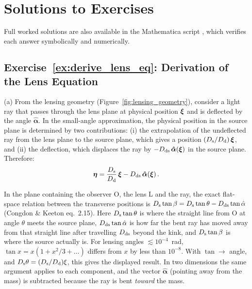 
\section{Solutions to Exercises}
\label{sec:lens_eq_solutions}

\noindent
Full worked solutions are also available in the Mathematica script
,
which verifies each answer symbolically and numerically.

\subsection*{Exercise~\ref{ex:derive_lens_eq}: Derivation of the Lens Equation}

(a) From the lensing geometry (Figure~\ref{fig:lensing_geometry}),
consider a light ray that passes through the lens plane at physical position
$\boldsymbol{\xi}$ and is deflected by the angle $\boldsymbol{\hat{\alpha}}$.  In the
small-angle approximation, the physical position in the source plane is
determined by two contributions: (i) the extrapolation of the undeflected
ray from the lens plane to the source plane, which gives a position
$(D_{\mathrm{s}}/D_{\mathrm{d}})\,\boldsymbol{\xi}$, and (ii) the deflection, which displaces the ray by
$-D_{\mathrm{ds}}\,\boldsymbol{\hat{\alpha}}(\boldsymbol{\xi})$ in the source plane.  Therefore:
\begin{equation*}
    \boldsymbol{\eta} = \frac{D_{\mathrm{s}}}{D_{\mathrm{d}}}\,\boldsymbol{\xi}
    - D_{\mathrm{ds}}\,\boldsymbol{\hat{\alpha}}(\boldsymbol{\xi}) \,.
\end{equation*}
\begin{derivation}
In the plane containing the observer O, the lens L and the ray, the exact
flat-space relation between the transverse positions is
$D_{\mathrm{s}}\tan\beta = D_{\mathrm{s}}\tan\theta - D_{\mathrm{ds}}\tan\hat{\alpha}$ (Congdon \& Keeton eq.~2.15).
Here $D_{\mathrm{s}}\tan\theta$ is where the straight line from O at angle $\theta$
meets the source plane, $D_{\mathrm{ds}}\tan\hat{\alpha}$ is how far the bent ray has
moved away from that straight line after travelling $D_{\mathrm{ds}}$ beyond the
kink, and $D_{\mathrm{s}}\tan\beta$ is where the source actually is.
For lensing angles $\lesssim 10^{-4}$~rad, $\tan x = x(1 + x^2/3 + \dots)$ differs
from $x$ by less than $10^{-8}$. With $\tan \to$ angle, and $D_{\mathrm{s}}\theta =
(D_{\mathrm{s}}/D_{\mathrm{d}})\xi$, this gives the displayed result. In two dimensions the same
argument applies to each component, and the vector $\boldsymbol{\hat{\alpha}}$
(pointing away from the mass) is subtracted because the ray is bent
\emph{toward} the mass.
\end{derivation}


